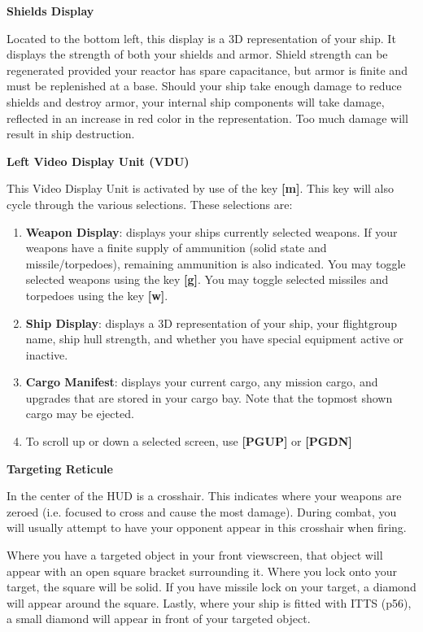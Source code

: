 \documentclass{article}
\begin{document}
\textbf{Shields Display }

Located to the bottom left, this display is a 3D representation of your ship. It displays the strength of both your shields and armor. Shield strength can be regenerated provided your reactor has spare capacitance, but armor is finite and must be replenished at a base. Should your ship take enough damage to reduce shields and destroy armor, your internal ship components will take damage, reflected in an increase in red color in the representation. Too much damage will result in ship destruction. 

\textbf{Left Video Display Unit (VDU) }

This Video Display Unit is activated by use of the key \textbf{[m]}. This key will also cycle through the various selections. These selections are: 

\begin{enumerate}
\item  \textbf{Weapon Display}: displays your ships currently selected weapons. If your weapons have a finite supply of ammunition (solid state and missile/torpedoes), remaining ammunition is also indicated. You may toggle selected weapons using the key \textbf{[g]}. You may toggle selected missiles and torpedoes using the key \textbf{[w]}. 

\item  \textbf{Ship Display}: displays a 3D representation of your ship, your flightgroup name, ship hull strength, and whether you have special equipment active or inactive.  

\item  \textbf{Cargo Manifest}: displays your current cargo, any mission cargo, and upgrades that are stored in your cargo bay. Note that the topmost shown cargo may be ejected.  

\item  To scroll up or down a selected screen, use \textbf{[PGUP] }or \textbf{[PGDN] }
\end{enumerate}



\textbf{Targeting Reticule }

In the center of the HUD is a crosshair. This indicates where your weapons are zeroed (i.e. focused to cross and cause the most damage). During combat, you will usually attempt to have your opponent appear in this crosshair when firing. 



Where you have a targeted object in your front viewscreen, that object will appear with an open square bracket surrounding it. Where you lock onto your target, the square will be solid. If you have missile lock on your target, a diamond will appear around the square. Lastly, where your ship is fitted with ITTS (p56), a small diamond will appear in front of your targeted object. 
\end{document}
